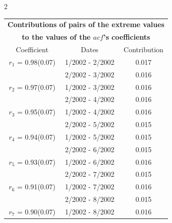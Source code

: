 
\thispagestyle{empty}
\begin{multicols}{2}{ 
\begin{tabular}{ccc}
\multicolumn{3}{c}{\textbf{Contributions of pairs of the extreme values} }  \vspace{-.10in}  \\ 
\multicolumn{3}{c}{ \textbf{to the values of the $acf$'s coefficients}} \\ 
\hline 
\hline                  Coefficient  &  Dates &  Contribution \\ 
\hline 
  $r_{ 1}$ = 0.98(0.07) &       1/2002 -  2/2002 &        0.017   \vspace{-.10in} \\  
&        2/2002 -  3/2002 &        0.016  \vspace{-.02in} \\ \hline 
  $r_{ 2}$ = 0.97(0.07) &       1/2002 -  3/2002 &        0.016   \vspace{-.10in} \\  
&        2/2002 -  4/2002 &        0.016  \vspace{-.02in} \\ \hline 
  $r_{ 3}$ = 0.95(0.07) &       1/2002 -  4/2002 &        0.016   \vspace{-.10in} \\  
&        2/2002 -  5/2002 &        0.015  \vspace{-.02in} \\ \hline 
  $r_{ 4}$ = 0.94(0.07) &       1/2002 -  5/2002 &        0.015   \vspace{-.10in} \\  
&        2/2002 -  6/2002 &        0.015  \vspace{-.02in} \\ \hline 
  $r_{ 5}$ = 0.93(0.07) &       1/2002 -  6/2002 &        0.016   \vspace{-.10in} \\  
&        2/2002 -  7/2002 &        0.015  \vspace{-.02in} \\ \hline 
  $r_{ 6}$ = 0.91(0.07) &       1/2002 -  7/2002 &        0.016   \vspace{-.10in} \\  
&        2/2002 -  8/2002 &        0.015  \vspace{-.02in} \\ \hline 
  $r_{ 7}$ = 0.90(0.07) &       1/2002 -  8/2002 &        0.016   \vspace{-.10in} \\  

\end{tabular}}
\end{multicols}
